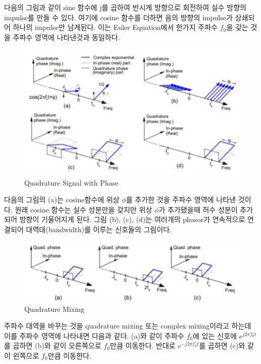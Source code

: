     다음의 그림과 같이 sine 함수에 j를 곱하여 반시계 방향으로 회전하여 실수 방향의 impulse를 만들 수 있다. 여기에 cosine 함수를 더하면 음의 방향의 impulse가 상쇄되어 하나의 impulse만 남게된다. 이는 Euler Equation에서 한가지 주파수 $f_0$을 갖는 것을 주파수 영역에 나타낸것과 동일하다.\\
    \vspace{-4mm}  
    \begin{figure}[!h]\centering
		\includegraphics[width=.7\textwidth]{image/week02/2-2-3.png}
		\caption{\small Quadrature Signal with Phase}
		\vspace{-10pt}
    \end{figure}
    
    다음의 그림의 (a)는 cosine함수에 위상 $\phi$를 추가한 것을 주파수 영역에 나타낸 것이다. 원래 cosine 함수는 실수 성분만을 갖지만 위상 $\phi$가 추가됐을때 허수 성분이 추가되어 방향이 기울어지게 된다. 그림 (b), (c), (d)는 여러개의 phasor가 연속적으로 연결되어 대역대(bandwidth)를 이루는 신호들의 그림이다.\\
    \vspace{-4mm}  
    \begin{figure}[!h]\centering
		\includegraphics[width=.75\textwidth]{image/week02/2-2-4.png}
		\caption{\small Quadrature Mixing}
		\vspace{-10pt}
    \end{figure}


    
    주파수 대역을 바꾸는 것을 quadrature mixing 또는 complex mixing이라고 하는데 이를 주파수 영역에 나타내면 다음과 같다.
    (a)와 같이 주파수 $f_0$에 있는 신호에 $e^{j2\pi f_0 t}$를 곱하면 (b)와 같이 오른쪽으로 $f_0$만큼 이동한다. 반대로 $e^{-j2\pi f_0 t}$를 곱하면 (c)와 같이 왼쪽으로 $f_0$만큼 이동한다.\\

